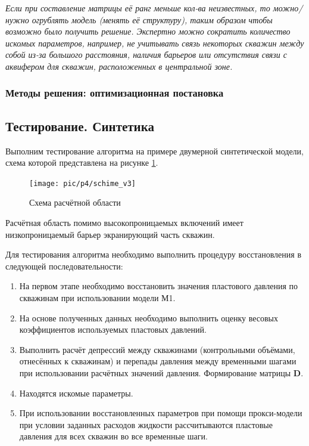 \documentclass[14pt]{article}
\begin{document}
\textit{Если при составление матрицы её ранг меньше кол-ва неизвестных, то  можно/нужно огрублять модель (менять её структуру), таким образом чтобы возможно было получить решение. Экспертно можно сократить количество искомых параметров, например, не учитывать связь некоторых скважин между собой из-за большого расстояния, наличия барьеров или отсутствия связи с аквифером для скважин, расположенных в центральной зоне.}

\subsubsection{Методы решения: оптимизационная постановка}

\subsection{Тестирование. Синтетика}
Выполним тестирование алгоритма на примере двумерной синтетической модели, схема которой представлена на  рисунке \ref{fig:map_kp_v2}. 
\begin{figure}
	\centering
	\texttt{[image: pic/p4/schime\_v3]}
	\caption{Схема расчётной области}
	\label{fig:map_kp_v2}
\end{figure}
Расчётная область помимо высокопроницаемых включений имеет низкопроницаемый барьер экранирующий часть скважин.

Для тестирования алгоритма необходимо выполнить процедуру восстановления в следующей последовательности:
\begin{enumerate}
	\item На первом этапе необходимо восстановить значения пластового давления по скважинам при использовании модели М1.
	\item На основе полученных данных необходимо выполнить оценку весовых коэффициентов используемых пластовых давлений.
	\item Выполнить расчёт депрессий между скважинами (контрольными объёмами, отнесённых к скважинам) и перепады давления между временными шагами при использовании расчётных значений давления. Формирование матрицы $\boldsymbol{D}$.
	\item Находятся искомые параметры.
	\item При использовании восстановленных параметров при помощи прокси-модели при условии заданных расходов жидкости рассчитываются пластовые давления для всех скважин во все временные шаги.
\end{enumerate}
\end{document}
